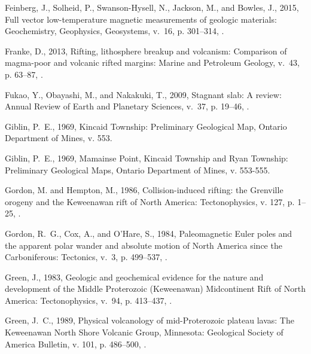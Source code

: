 \documentclass[11pt,letterpaper]{article}
\begin{document}
\begin{thebibliography}{153}
Feinberg, J., Solheid, P., Swanson-Hysell, N., Jackson, M., and Bowles, J.,
  2015, Full vector low-temperature magnetic measurements of geologic
  materials: Geochemistry, Geophysics, Geosystems, v.~16, p. 301--314,
  .

Franke, D., 2013, Rifting, lithosphere breakup and volcanism: Comparison of
  magma-poor and volcanic rifted margins: Marine and Petroleum Geology, v.~43,
  p. 63--87, .

Fukao, Y., Obayashi, M., and Nakakuki, T., 2009, Stagnant slab: A review:
  Annual Review of Earth and Planetary Sciences, v.~37, p. 19--46,
  .

Giblin, P.~E., 1969{}, Kincaid {T}ownship: Preliminary Geological
  Map, Ontario Department of Mines, v. 553.

Giblin, P.~E., 1969{}, {Mamainse Point, Kincaid Township and Ryan
  Township}: Preliminary Geological Maps, Ontario Department of Mines, v.
  553-555.

Gordon, M. and Hempton, M., 1986, Collision-induced rifting: the {G}renville
  orogeny and the {K}eweenawan rift of {N}orth {A}merica: Tectonophysics, v.
  127, p. 1--25, .

Gordon, R.~G., Cox, A., and O'Hare, S., 1984, {Paleomagnetic Euler poles and
  the apparent polar wander and absolute motion of North America since the
  Carboniferous}: Tectonics, v.~3, p. 499--537, .

Green, J., 1983, Geologic and geochemical evidence for the nature and
  development of the {M}iddle {P}roterozoic ({K}eweenawan) {M}idcontinent
  {R}ift of {N}orth {A}merica: Tectonophysics, v.~94, p. 413--437,
  .

Green, J.~C., 1989, {Physical volcanology of mid-Proterozoic plateau lavas: The
  Keweenawan North Shore Volcanic Group, Minnesota}: Geological Society of
  America Bulletin, v. 101, p. 486--500,
  .


\end{thebibliography}
\end{document}
